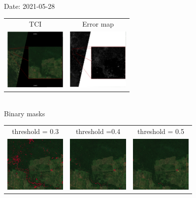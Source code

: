 \documentclass{beamer}
\begin{document}
\begin{frame}{Date: 2021-05-28}
    \centering
        \begin{tabular}{cc}
        TCI & Error map\\
        \includegraphics[width=3cm]{Figures/v3/20210528/TCI/TCI_zoom2.pdf}
        &
        \includegraphics[width=3cm]{Figures/v3/20210528/error_map/error_zoom2.pdf}
    \end{tabular}
    \\
    \centering
     Binary masks
        \begin{tabular}{ccc}
            threshold = 0.3  & threshold =0.4 &  threshold = 0.5 \\
        \includegraphics[width=3cm]{Figures/v3/20210528/umbral_03/zoom2.png}
        &
        \includegraphics[width=3cm]{Figures/v3/20210528/umbral_04/zoom2.png}
        &
        \includegraphics[width=3cm]{Figures/v3/20210528/umbral_05/zoom2.png}
        \end{tabular}
\end{frame}
\end{document}
